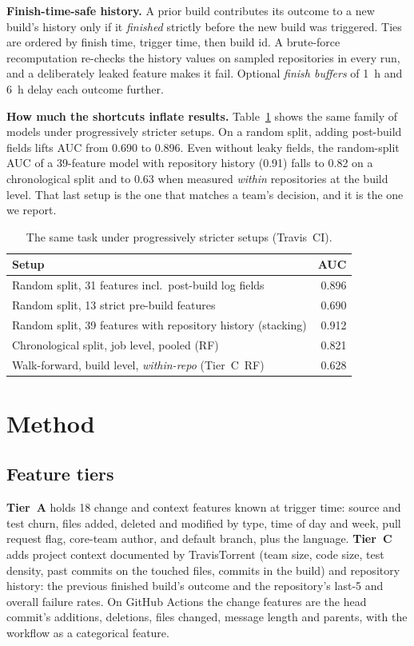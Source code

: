 \documentclass[conference]{IEEEtran}
\newcommand{\tierC}{Tier~C}
\begin{document}
\textbf{Finish-time-safe history.} A prior build contributes its outcome to a new build's history only if it \emph{finished} strictly before the new build was triggered. Ties are ordered by finish time, trigger time, then build id. A brute-force recomputation re-checks the history values on sampled repositories in every run, and a deliberately leaked feature makes it fail. Optional \emph{finish buffers} of 1~h and 6~h delay each outcome further.

\textbf{How much the shortcuts inflate results.} Table~\ref{tab:leakage} shows the same family of models under progressively stricter setups. On a random split, adding post-build fields lifts AUC from 0.690 to 0.896. Even without leaky fields, the random-split AUC of a 39-feature model with repository history (0.91) falls to 0.82 on a chronological split and to 0.63 when measured \emph{within} repositories at the build level. That last setup is the one that matches a team's decision, and it is the one we report.

\begin{table}[t]
\caption{The same task under progressively stricter setups (Travis~CI).}
\label{tab:leakage}
\centering
\footnotesize
\setlength{\tabcolsep}{4pt}
\begin{tabular}{@{}p{4.9cm}r@{}}
\toprule
Setup & AUC \\
\midrule
Random split, 31 features incl.\ post-build log fields & 0.896 \\
Random split, 13 strict pre-build features & 0.690 \\
Random split, 39 features with repository history (stacking) & 0.912 \\
Chronological split, job level, pooled (RF) & 0.821 \\
Walk-forward, build level, \emph{within-repo} (\tierC\ RF) & 0.628 \\
\bottomrule
\end{tabular}
\end{table}

\section{Method}

\subsection{Feature tiers}
\textbf{Tier~A} holds 18 change and context features known at trigger time: source and test churn, files added, deleted and modified by type, time of day and week, pull request flag, core-team author, and default branch, plus the language. \textbf{\tierC} adds project context documented by TravisTorrent (team size, code size, test density, past commits on the touched files, commits in the build) and repository history: the previous finished build's outcome and the repository's last-5 and overall failure rates. On GitHub Actions the change features are the head commit's additions, deletions, files changed, message length and parents, with the workflow as a categorical feature.
\end{document}
